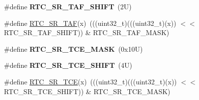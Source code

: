 \begin{DoxyCompactItemize}
\#define {\bfseries R\+T\+C\+\_\+\+S\+R\+\_\+\+T\+A\+F\+\_\+\+S\+H\+I\+FT}~(2\+U)
\item 
\#define \mbox{\hyperlink{group___r_t_c___register___masks_gaba0bf9515e6e6dd37ca03b337f068bb1}{R\+T\+C\+\_\+\+S\+R\+\_\+\+T\+AF}}(x)~(((uint32\+\_\+t)(((uint32\+\_\+t)(x)) $<$$<$ R\+T\+C\+\_\+\+S\+R\+\_\+\+T\+A\+F\+\_\+\+S\+H\+I\+FT)) \& R\+T\+C\+\_\+\+S\+R\+\_\+\+T\+A\+F\+\_\+\+M\+A\+SK)
\item 
\mbox{\label{group___r_t_c___register___masks_gabcb29faa7aa3cee888e06e6b08236907}} 
\#define {\bfseries R\+T\+C\+\_\+\+S\+R\+\_\+\+T\+C\+E\+\_\+\+M\+A\+SK}~(0x10\+U)
\item 
\mbox{\label{group___r_t_c___register___masks_ga120f7d25fec9feca0a62b6e79683e3ac}} 
\#define {\bfseries R\+T\+C\+\_\+\+S\+R\+\_\+\+T\+C\+E\+\_\+\+S\+H\+I\+FT}~(4\+U)
\item 
\#define \mbox{\hyperlink{group___r_t_c___register___masks_gaeffcb773dfeb9cb475867d46b29c3bff}{R\+T\+C\+\_\+\+S\+R\+\_\+\+T\+CE}}(x)~(((uint32\+\_\+t)(((uint32\+\_\+t)(x)) $<$$<$ R\+T\+C\+\_\+\+S\+R\+\_\+\+T\+C\+E\+\_\+\+S\+H\+I\+FT)) \& R\+T\+C\+\_\+\+S\+R\+\_\+\+T\+C\+E\+\_\+\+M\+A\+SK)
\end{DoxyCompactItemize}
